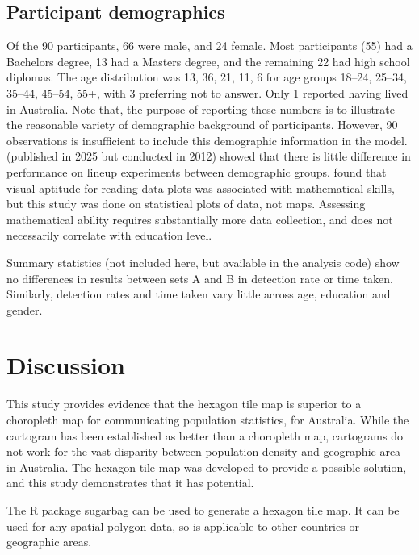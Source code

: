 \documentclass[
doublespace,
  times]{anzsauth}
\begin{document}
\subsection{Participant demographics}\label{participant-demographics}

Of the 90 participants, 66 were male, and 24 female. Most participants
(55) had a Bachelors degree, 13 had a Masters degree, and the remaining
22 had high school diplomas. The age distribution was 13, 36, 21, 11, 6
for age groups 18--24, 25--34, 35--44, 45--54, 55+, with 3 preferring
not to answer. Only 1 reported having lived in Australia. Note that, the
purpose of reporting these numbers is to illustrate the reasonable
variety of demographic background of participants. However, 90
observations is insufficient to include this demographic information in
the model. \citet{MHC} (published in 2025 but conducted in 2012) showed
that there is little difference in performance on lineup experiments
between demographic groups. \citet{VH2016} found that visual aptitude
for reading data plots was associated with mathematical skills, but this
study was done on statistical plots of data, not maps. Assessing
mathematical ability requires substantially more data collection, and
does not necessarily correlate with education level.

Summary statistics (not included here, but available in the analysis
code) show no differences in results between sets A and B in detection
rate or time taken. Similarly, detection rates and time taken vary
little across age, education and gender.

\section{Discussion}\label{discussion}

This study provides evidence that the hexagon tile map is superior to a
choropleth map for communicating population statistics, for Australia.
While the cartogram has been established as better than a choropleth
map, cartograms do not work for the vast disparity between population
density and geographic area in Australia. The hexagon tile map was
developed to provide a possible solution, and this study demonstrates
that it has potential.

The \textsf{R} package \textsf{sugarbag} can be used to generate a
hexagon tile map. It can be used for any spatial polygon data, so is
applicable to other countries or geographic areas.
\end{document}
